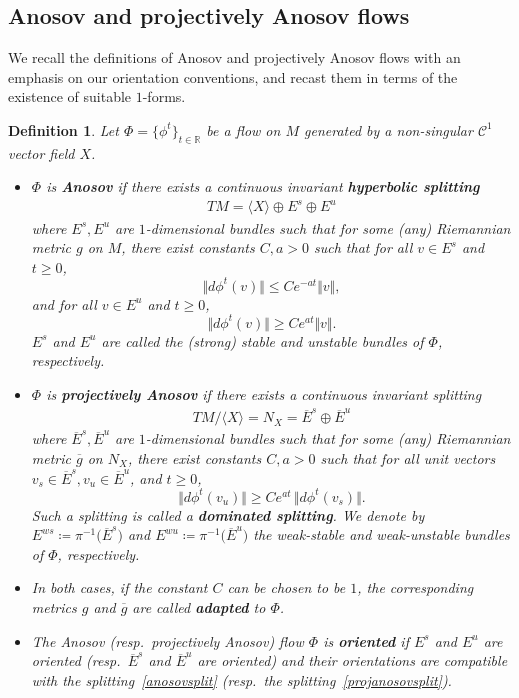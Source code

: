\documentclass[letterpaper, 11pt]{article}
\numberwithin{equation}{section}
\newtheorem{defn}[thm]{Definition}
\newcommand{\R}{\mathbb{R}}
\begin{document}
    	\subsection{Anosov and projectively Anosov flows} \label{sec:anosov}


We recall the definitions of Anosov and projectively Anosov flows with an emphasis on our orientation conventions, and recast them in terms of the existence of suitable $1$-forms.

\begin{defn} \label{definition:defanosov}
Let $\Phi = \{\phi^t\}_{t \in \R}$ be a flow on $M$ generated by a non-singular $\mathcal{C}^1$ vector field $X$.
\begin{itemize}
\item $\Phi$ is \textbf{Anosov} if there exists a continuous invariant \textbf{hyperbolic splitting}
\begin{align} \label{anosovsplit}
TM = \langle X \rangle \oplus E^s \oplus E^u
\end{align}
where $E^s, E^u$ are $1$-dimensional bundles such that for some (any) Riemannian metric $g$ on $M$, there exist constants $C, a >0$ such that for all $v \in E^s$ and $t \geq 0$, $$\Vert d\phi^t(v)\Vert \leq C e^{-at} \Vert v \Vert,$$
and for all $v \in E^u$ and $t \geq 0$, $$\Vert d\phi^t(v)\Vert \geq C e^{at} \Vert v \Vert.$$
$E^s$ and $E^u$ are called the (strong) stable and unstable bundles of $\Phi$, respectively.
\item $\Phi$ is \textbf{projectively Anosov} if there exists a continuous invariant splitting
\begin{align} \label{projanosovsplit}
TM \slash \langle X \rangle = N_X = \overline{E}^s \oplus \overline{E}^u
\end{align}
where $\overline{E}^s, \overline{E}^u$ are $1$-dimensional bundles such that for some (any) Riemannian metric $\overline{g}$ on $N_X$, there exist constants $C, a >0$ such that for all unit vectors $v_s \in \overline{E}^s, v_u \in \overline{E}^u$, and $t \geq 0$, $$ \Vert d\phi^t(v_u)\Vert \geq C e^{at} \, \Vert d\phi^t(v_s) \Vert.$$
Such a splitting is called a \textbf{dominated splitting}. We denote by $E^{ws} \coloneqq \pi^{-1}\big(\overline{E}^s\big)$ and $E^{wu} \coloneqq \pi^{-1}\big(\overline{E}^u\big)$ the weak-stable and weak-unstable bundles of $\Phi$, respectively.
\item In both cases, if the constant $C$ can be chosen to be $1$, the corresponding metrics $g$ and $\overline{g}$ are called \textbf{adapted} to $\Phi$. 
\item The Anosov (resp.~projectively Anosov) flow $\Phi$ is \textbf{oriented} if $E^s$ and $E^u$ are oriented (resp.~$\overline{E}^s$ and $\overline{E}^u$ are oriented) and their orientations are compatible with the splitting~\eqref{anosovsplit} (resp.~the splitting~\eqref{projanosovsplit}).
\end{itemize}
\end{defn}
\end{document}
